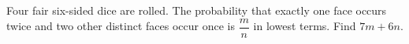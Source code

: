 Four fair six-sided dice are rolled. The probability that exactly one face occurs twice and two other distinct faces occur once is $\dfrac{m}{n}$ in lowest terms. Find $ 7m+6n $.
